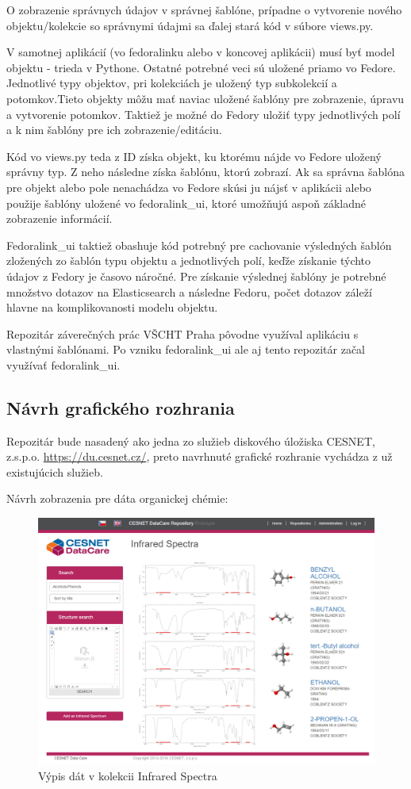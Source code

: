 \documentclass[thesis=M,slovak]{FITthesis}[2013/05/06]
\begin{document}
O zobrazenie správnych údajov v správnej šablóne, prípadne o vytvorenie nového objektu/kolekcie so správnymi údajmi sa ďalej stará kód v súbore views.py.

V samotnej aplikácií (vo fedoralinku alebo v koncovej aplikácii) musí byť model objektu - trieda v Pythone. Ostatné potrebné veci sú uložené priamo vo Fedore. Jednotlivé typy objektov, pri kolekciách je uložený typ subkolekcií a potomkov.Tieto objekty môžu mať naviac uložené šablóny pre zobrazenie, úpravu a vytvorenie potomkov. Taktiež je možné do Fedory uložiť typy jednotlivých polí a k nim šablóny pre ich zobrazenie/editáciu.

Kód vo views.py teda z ID získa objekt, ku ktorému nájde vo Fedore uložený správny typ. Z neho následne získa šablónu, ktorú zobrazí. Ak sa správna šablóna pre objekt alebo pole nenachádza vo Fedore skúsi ju nájsť v aplikácii alebo použije šablóny uložené vo fedoralink\_ui, ktoré umožňujú aspoň základné zobrazenie informácií.

Fedoralink\_ui taktiež obashuje kód potrebný pre cachovanie výsledných šablón zložených zo šablón typu objektu a jednotlivých polí, keďže získanie týchto údajov z Fedory je časovo náročné. Pre získanie výslednej šablóny je potrebné množstvo dotazov na Elasticsearch a následne Fedoru, počet dotazov záleží hlavne na komplikovanosti modelu objektu.

Repozitár záverečných prác VŠCHT Praha pôvodne využíval aplikáciu s vlastnými šablónami. Po vzniku fedoralink\_ui ale aj tento repozitár začal využívať fedoralink\_ui.

\subsection{Návrh grafického rozhrania}
Repozitár bude nasadený ako jedna zo služieb diskového úložiska CESNET, z.s.p.o. \url{https://du.cesnet.cz/}, preto navrhnuté grafické rozhranie vychádza z už existujúcich služieb.

Návrh zobrazenia pre dáta organickej chémie:
\begin{figure}\centering
	\includegraphics[width=1.0\textwidth]{grafika/list_InfraredSpectra.png}
 	\caption[listInfraredSpectra]{Výpis dát v kolekcii Infrared Spectra}\label{graphics:listInfrared}
\end{figure}
\end{document}
